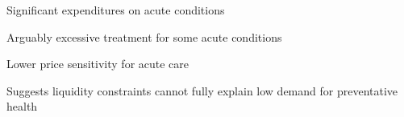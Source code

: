 \documentclass[aspectratio=169, 10pt, handout]{beamer}
\newenvironment{wideitemize}{\itemize\addtolength{\itemsep}{10pt}}{\enditemize}
\begin{document}
\begin{frame}{Significant expenditures on acute conditions}

\begin{wideitemize}

	\item Arguably excessive treatment for some acute conditions
	
	\item Lower price sensitivity for acute care \citep{Cohen2015}
	
	\item Suggests liquidity constraints cannot fully explain low demand for preventative health

\end{wideitemize}

\end{frame}
\end{document}
